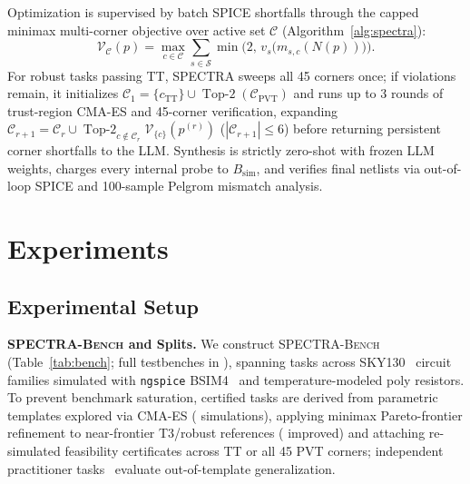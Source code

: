 \documentclass{article}
\theoremstyle{plain}
\begin{document}
Optimization is supervised by batch SPICE shortfalls through the capped minimax multi-corner objective over active set $\mathcal{C}$ (Algorithm~\ref{alg:spectra}):
\begin{equation}
  \mathcal{V}_{\mathcal{C}}(p) = \max_{c \in \mathcal{C}} \sum_{s \in \mathcal{S}} \min\!\Big(2,\, v_s\!\big(m_{s,c}(N(p))\big)\Big).
  \label{eq:icml_viol}
\end{equation}
For robust tasks passing TT, \textsc{SPECTRA} sweeps all 45 corners once; if violations remain, it initializes $\mathcal{C}_1 = \{c_{\text{TT}}\} \cup \operatorname{Top-2}(\mathcal{C}_{\text{PVT}})$ and runs up to 3 rounds of trust-region CMA-ES and 45-corner verification, expanding $\mathcal{C}_{r+1} = \mathcal{C}_r \cup \operatorname{Top-2}_{c \notin \mathcal{C}_r} \mathcal{V}_{\{c\}}(p^{(r)})$ ($|\mathcal{C}_{r+1}| \le 6$) before returning persistent corner shortfalls to the LLM. Synthesis is strictly zero-shot with frozen LLM weights, charges every internal probe to $B_{\text{sim}}$, and verifies final netlists via out-of-loop SPICE and 100-sample Pelgrom mismatch analysis.

\section{Experiments}
\label{sec:exp}

\subsection{Experimental Setup}


\textbf{\textsc{SPECTRA-Bench} and Splits.} We construct \textsc{SPECTRA-Bench} (Table~\ref{tab:bench}; full testbenches in ), spanning \NTasksTotal{} tasks across \NPrimaryFamilies{} SKY130~\citep{sky130pdk} circuit families simulated with \texttt{ngspice} BSIM4~\citep{ngspice42} and temperature-modeled poly resistors. To prevent benchmark saturation, \NCertified{} certified tasks are derived from \NTemplates{} parametric templates explored via CMA-ES (\NExploreEvals{} simulations), applying minimax Pareto-frontier refinement to \NHard{} near-frontier T3/robust references (\NFrontier{} improved) and attaching re-simulated feasibility certificates across TT or all 45 PVT corners; \NDesigner{} independent practitioner tasks~\citep{allen2012cmos,razavi2017design} evaluate out-of-template generalization.
\end{document}
